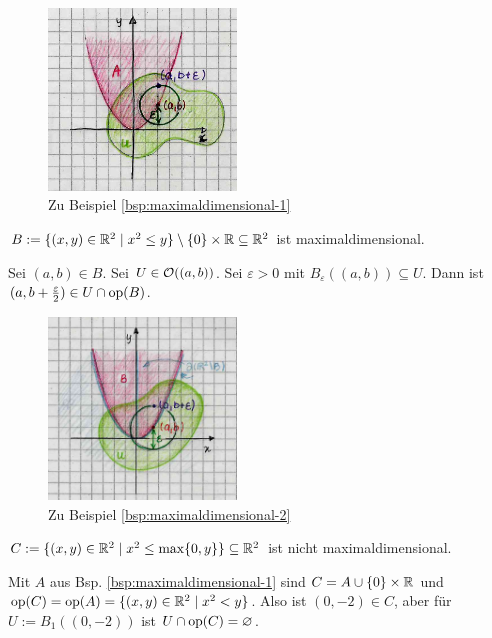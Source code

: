     
    \begin{figure}[ht]
        \centering
        \includegraphics[width=5cm]{gfx/maxdim-1.png}
        \caption{Zu Beispiel \ref{bsp:maximaldimensional-1}}
        \label{fig:maxdim-1}
    \end{figure}

    \begin{bsp}\label{bsp:maximaldimensional-2}
        $B := \{(x,y) \in \mathbb{R}^2 \mid x^2 \leq y\} \setminus \{0\} \times \mathbb{R} \subseteq \mathbb{R}^2$ ist maximaldimensional.
    \end{bsp}
    \begin{bew}
        Sei $(a,b) \in B$. Sei $U \in \mathcal{O}((a,b))$. Sei $\varepsilon > 0$ mit $B_\varepsilon((a,b)) \subseteq U$. Dann ist $(a,b+\frac{\varepsilon}{2}) \in U \cap \text{op}(B)$.
    \end{bew}

    
    \begin{figure}[ht]
        \centering
        \includegraphics[width=5cm]{gfx/maxdim-2.png}
        \caption{Zu Beispiel \ref{bsp:maximaldimensional-2}}
        \label{fig:maxdim-2}
    \end{figure}

    \begin{gegenbsp}\label{gegenbsp:maximaldimensional}
        $C := \{(x,y) \in \mathbb{R}^2 \mid x^2 \leq \max\{0,y\}\} \subseteq \mathbb{R}^2$ ist nicht maximaldimensional.
    \end{gegenbsp}
    \begin{bew}
        Mit $A$ aus Bsp. \ref{bsp:maximaldimensional-1} sind $C = A \cup \{0\} \times \mathbb{R}$ und $\text{op}(C) = \text{op}(A) = \{(x,y) \in \mathbb{R}^2 \mid x^2 < y\}$. Also ist $(0,-2) \in C$, aber für $U := B_1((0,-2))$ ist $U \cap \text{op}(C) = \varnothing$.
    \end{bew}


